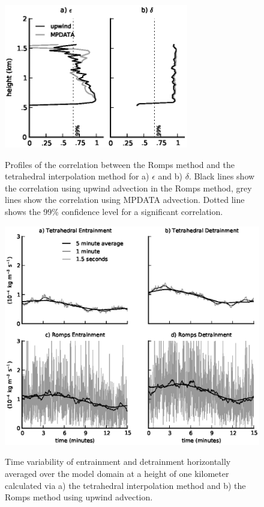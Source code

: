 \documentclass[12pt]{article}
\begin{document}
\begin{figure}[t]
  \noindent
  \includegraphics[width=19pc,angle=0]{./figures/correlations}\\
  \caption{
  Profiles of the correlation between the Romps method and the
  tetrahedral interpolation method for a) $\epsilon$ and b) $\delta$.  Black 
  lines show the correlation using upwind advection in the Romps method, grey 
  lines show the correlation using MPDATA advection.  Dotted line shows the 
  99\% confidence level for a significant correlation.
  }
  \label{fig:correlations}
\end{figure}

\begin{figure}[t]
  \noindent
  \includegraphics[width=39pc,angle=0]{./figures/averaging_convergence}\\ 
  \caption{Time variability of entrainment and detrainment horizontally 
  averaged over the model domain at a height of one kilometer calculated via 
  a) the tetrahedral interpolation method and b) the Romps method using upwind 
  advection.
  }
  \label{fig:averaging_convergence}
\end{figure}
\end{document}
